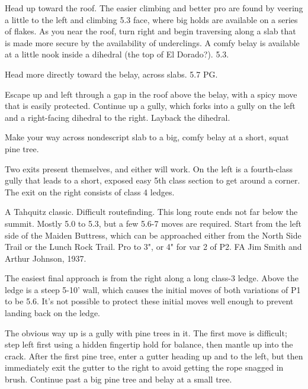 \documentclass{tahquitz}
\begin{document}
 Head up toward the roof. The easier climbing and better pro are found
by veering a little to the left and climbing 5.3 face, where big holds are available on a series of flakes.
As you near the roof, turn right and begin traversing
along a slab that is made more secure by the availability of underclings. A comfy
belay is available at a little nook inside a dihedral (the top of El Dorado?). 5.3.

 Head more directly toward the belay, across slabs. 5.7 PG.

 Escape up and left through a gap in the roof above the belay, with a spicy move
that is easily protected. Continue up a gully, which forks into a gully on the left and a right-facing
dihedral to the right. Layback the dihedral.

 Make your way across nondescript slab to a big, comfy belay at a short, squat pine tree.

 Two exits present themselves, and either will work. On the left is a fourth-class
gully that leads to a short, exposed easy 5th class section to get around a corner.
The exit on the right consists of class 4 ledges.

\somespace

\northgully





A Tahquitz classic. Difficult routefinding. This long route ends not far
below the summit.
Mostly 5.0 to 5.3, but a few 5.6-7 moves are required.
Start from the left side of the Maiden Buttress, which can be
approached either from the North Side Trail or the Lunch Rock Trail.
Pro to 3", or 4" for var 2 of P2.
FA Jim Smith and Arthur Johnson, 1937.

The easiest final approach is from the right along a long class-3 ledge.
Above the ledge is a steep 5-10' wall, which causes the initial moves of
both variations of P1 to be 5.6. It's not possible to protect these initial
moves well enough to prevent landing back on the ledge.

 The obvious way up is a gully with pine trees in it. The first move is difficult;
step left first using a hidden fingertip hold for balance, then mantle
up into the crack.
After the first pine tree, enter a gutter heading up
and to the left, but then immediately exit the gutter to the right to
avoid getting the rope snagged in brush. Continue past a big pine
tree and belay at a small tree.
\end{document}
